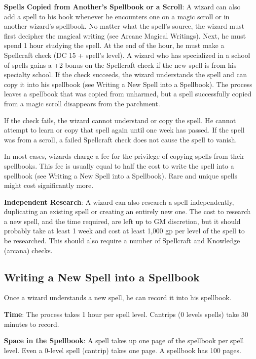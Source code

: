 \textbf{Spells Copied from Another's Spellbook or a Scroll}: A wizard can also add a spell to his book whenever he encounters one on a magic scroll or in another wizard's spellbook. No matter what the spell's source, the wizard must first decipher the magical writing (see Arcane Magical Writings). Next, he must spend 1 hour studying the spell. At the end of the hour, he must make a Spellcraft check (DC 15 + spell's level). A wizard who has specialized in a school of spells gains a +2 bonus on the Spellcraft check if the new spell is from his specialty school. If the check succeeds, the wizard understands the spell and can copy it into his spellbook (see Writing a New Spell into a Spellbook). The process leaves a spellbook that was copied from unharmed, but a spell successfully copied from a magic scroll disappears from the parchment.
				
If the check fails, the wizard cannot understand or copy the spell. He cannot attempt to learn or copy that spell again until one week has passed. If the spell was from a scroll, a failed Spellcraft check does not cause the spell to vanish.
				
In most cases, wizards charge a fee for the privilege of copying spells from their spellbooks. This fee is usually equal to half the cost to write the spell into a spellbook (see Writing a New Spell into a Spellbook). Rare and unique spells might cost significantly more.
				
\textbf{Independent Research}: A wizard can also research a spell independently, duplicating an existing spell or creating an entirely new one. The cost to research a new spell, and the time required, are left up to GM discretion, but it should probably take at least 1 week and cost at least 1,000 gp per level of the spell to be researched. This should also require a number of Spellcraft and Knowledge (arcana) checks.
				
\subsection{Writing a New Spell into a Spellbook}

				
Once a wizard understands a new spell, he can record it into his spellbook.
				
\textbf{Time}: The process takes 1 hour per spell level. Cantrips (0 levels spells) take 30 minutes to record.
				
\textbf{Space in the Spellbook}: A spell takes up one page of the spellbook per spell level. Even a 0-level spell (cantrip) takes one page. A spellbook has 100 pages.
				
